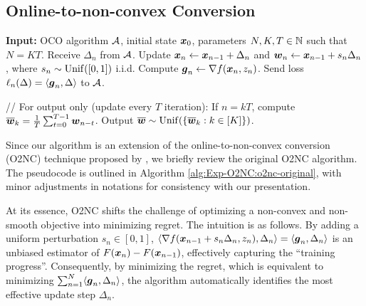 \subsection{Online-to-non-convex Conversion}

\begin{algorithm}[t]
\caption{O2NC \cite{cutkosky2023optimal}}
\label{alg:Exp-O2NC:o2nc-original}
\begin{algorithmic}[1]
    \State \textbf{Input:} OCO algorithm ${\cal A}$, initial state ${\boldsymbol{x}}_0$, parameters $N,K,T\in\mathbb N$ such that $N=KT$.
        \State Receive $\Delta_n$ from ${\cal A}$.
        \State Update ${\boldsymbol{x}}_n \gets {\boldsymbol{x}}_{n-1} + \Delta_n$ and ${\boldsymbol{w}}_n\gets{\boldsymbol{x}}_{n-1}+s_n\Delta_n$, where $s_n\sim\mathrm{Unif}([0,1])$ i.i.d.
        \State Compute ${\boldsymbol{g}}_n \gets \nabla f({\boldsymbol{x}}_n, z_n)$.
        \State Send loss $\ell_n(\Delta) = \langle {\boldsymbol{g}}_n,\Delta\rangle$ to ${\cal A}$.
        
        // For output only (update every $T$ iteration):
        \State If $n=kT$, compute $\overline{{\boldsymbol{w}}}_k = \frac{1}{T}\sum_{t=0}^{T-1} {\boldsymbol{w}}_{n-t}$.
    \EndFor
    \State Output $\overline {{\boldsymbol{w}}} \sim \mathrm{Unif}(\{\overline{{\boldsymbol{w}}}_k:k\in[K]\})$.
\end{algorithmic}
\end{algorithm}

Since our algorithm is an extension of the online-to-non-convex conversion (O2NC) technique proposed by \cite{cutkosky2023optimal}, we briefly review the original O2NC algorithm. The pseudocode is outlined in Algorithm \ref{alg:Exp-O2NC:o2nc-original}, with minor adjustments in notations for consistency with our presentation. 

At its essence, O2NC shifts the challenge of optimizing a non-convex and non-smooth objective into minimizing regret. The intuition is as follows. By adding a uniform perturbation $s_n\in[0,1]$, $\langle \nabla f({\boldsymbol{x}}_{n-1}+s_n\Delta_n,z_n), \Delta_n\rangle = \langle {\boldsymbol{g}}_n,\Delta_n\rangle$ is an unbiased estimator of $F({\boldsymbol{x}}_n)-F({\boldsymbol{x}}_{n-1})$, effectively capturing the ``training progress''. Consequently, by minimizing the regret, which is equivalent to minimizing $\sum_{n=1}^N\langle {\boldsymbol{g}}_n,\Delta_n\rangle$, the algorithm automatically identifies the most effective update step $\Delta_n$.